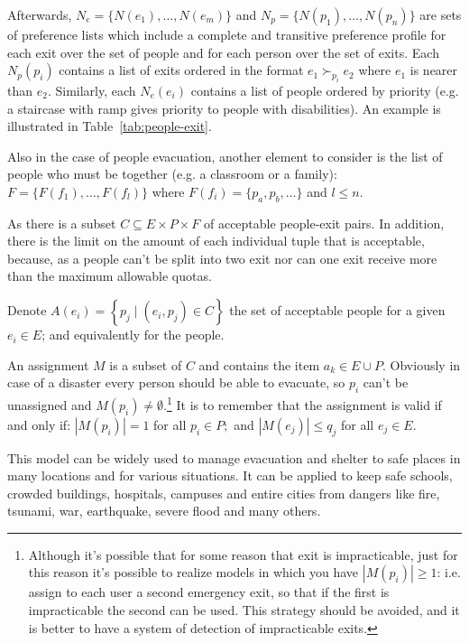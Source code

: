 Afterwards, \(N_e = \{N(e_1), \dots, N(e_m)\}\) and \(N_p = \{ N(p_1), \dots, N(p_n)\}\) are sets of preference lists which include a complete and transitive preference profile for each exit over the set of people and for each person over
the set of exits. Each \(N_p(p_i)\) contains a list of exits ordered in the format \(e_1 \succ_{p_i} e_2\) where \(e_1\) is nearer than \(e_2\). Similarly, each \(N_e(e_i)\) contains a list of people ordered by priority (e.g. a staircase with ramp gives priority to people with disabilities). An example is illustrated in Table~\ref{tab:people-exit}.

Also in the case of people evacuation, another element to consider is the list of people who must be together (e.g. a classroom or a family): \(F=\{F(f_1), \dots, F(f_l)\}\) where  \(F(f_i) = \{p_a, p_b, \dots\}\) and \(l\leq n\).
    
As there is a subset \(C \subseteq E \times P \times F\) of acceptable people-exit pairs.
In addition, there is the limit on the amount of each individual tuple that is acceptable, because, as a people can't be split into two exit nor can one exit receive more than the maximum allowable quotas.

Denote \( A \left( e_i \right) = \left\{ p_j \mid \left( e_i , p_j \right) \in C \right\} \) the set of acceptable people for a given \( e_i \in E \); and equivalently for the people.

An assignment \(M\) is a subset of \(C\) and contains the item \( a_k \in E \cup P \).
Obviously in case of a disaster every person should be able to evacuate, so  \( p_i\) can't be unassigned and \( M \left( p_i\right) \neq \emptyset \).\footnote{Although it's possible that for some reason that exit is impracticable, just for this reason it's possible to realize models in which you have \(|M \left( p_i \right)| \geq 1\): i.e. assign to each user a second emergency exit, so that if the first is impracticable the second can be used.
This strategy should be avoided, and it is better to have a system of detection of impracticable exits.}
It is to remember that the assignment is valid if and only if: \( \left| M \left( p_i\right) \right| = 1 \) for all \( p_i\in P ; \) and \( \left| M \left( e_j \right) \right| \leq q _ { j } \) for all \( e_j \in E  \).

This model can be widely used to manage evacuation and shelter to safe places in many locations and for various situations.
It can be applied to keep safe schools, crowded buildings, hospitals, campuses and entire cities from dangers like fire, tsunami, war, earthquake, severe flood and many others.

